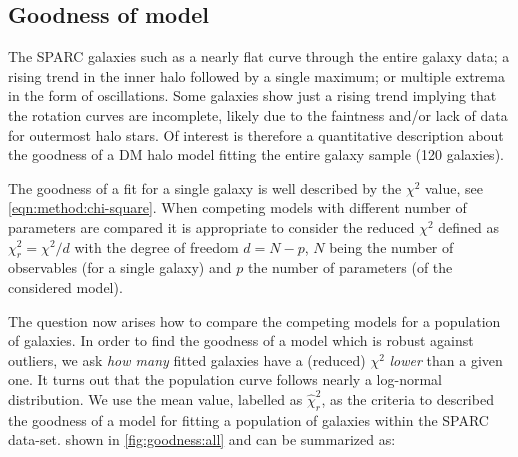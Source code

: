 \subsection{Goodness of model}
\label{sec:result:gof}

The SPARC galaxies  such as a nearly flat curve through the entire galaxy data; a rising trend in the inner halo followed by a single maximum; or multiple extrema in the form of oscillations.  Some galaxies show just a rising trend implying that the rotation curves are incomplete, likely due to the faintness and/or lack of data for outermost halo stars. Of interest is therefore a quantitative description about the goodness of a DM halo model fitting the entire galaxy sample (120 galaxies).

The goodness of a fit for a single galaxy is well described by the $\chi^2$ value, see \cref{eqn:method:chi-square}. When competing models with different number of parameters are compared it is appropriate to consider the reduced $\chi^2$ defined as $\chi_r^2 = \chi^2/d$ with the degree of freedom $d = N-p$, $N$ being the number of observables (for a single galaxy) and $p$ the number of parameters (of the considered model).

The question now arises how to compare the competing models for a population of galaxies. In order to find the goodness of a model which is robust against outliers, we ask \textit{how many} fitted galaxies have a (reduced) $\chi^2$ \textit{lower} than a given one. It turns out that the population curve  follows nearly a log-normal distribution. We use the mean value, labelled as $\hat \chi^2_r$, as the criteria to described the goodness of a model for fitting a population of galaxies within the SPARC data-set.  shown in \cref{fig:goodness:all} and can be summarized as:



